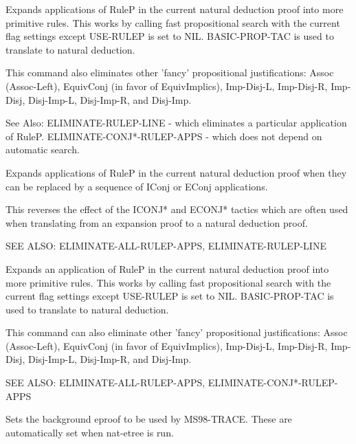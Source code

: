 \begin{description} 
\item[\parbox{\textwidth}{ELIMINATE-ALL-RULEP-APPS \textit{pfname}}]  
Expands applications of RuleP in the current natural deduction proof
into more primitive rules.  This works by calling fast propositional search with
the current flag settings except USE-RULEP is set to NIL.
BASIC-PROP-TAC is used to translate to natural deduction.

This command also eliminates other 'fancy' propositional justifications:
Assoc (Assoc-Left), EquivConj (in favor of EquivImplics),
Imp-Disj-L, Imp-Disj-R, Imp-Disj, Disj-Imp-L, Disj-Imp-R, and Disj-Imp.

See Also: 
ELIMINATE-RULEP-LINE - which eliminates a particular application of RuleP.
ELIMINATE-CONJ*-RULEP-APPS - which does not depend on automatic search.

\item[\parbox{\textwidth}{ELIMINATE-CONJ*-RULEP-APPS \textit{pfname}}]  
Expands applications of RuleP in the current natural deduction proof
when they can be replaced by a sequence of IConj or EConj applications.

This reverses the effect of the ICONJ* and ECONJ* tactics which are often
used when translating from an expansion proof to a natural deduction proof.

SEE ALSO: ELIMINATE-ALL-RULEP-APPS, ELIMINATE-RULEP-LINE

\item[\parbox{\textwidth}{ELIMINATE-RULEP-LINE \textit{line}}]  
Expands an application of RuleP in the current natural deduction proof
into more primitive rules.  This works by calling fast propositional search with
the current flag settings except USE-RULEP is set to NIL.
BASIC-PROP-TAC is used to translate to natural deduction.

This command can also eliminate other 'fancy' propositional justifications:
Assoc (Assoc-Left), EquivConj (in favor of EquivImplics),
Imp-Disj-L, Imp-Disj-R, Imp-Disj, Disj-Imp-L, Disj-Imp-R, and Disj-Imp.

SEE ALSO: ELIMINATE-ALL-RULEP-APPS, ELIMINATE-CONJ*-RULEP-APPS

\item[\parbox{\textwidth}{SET-BACKGROUND-EPROOF \textit{epr}}]  
Sets the background eproof to be used by MS98-TRACE.
These are automatically set when nat-etree is run.
\item
\end{description}

